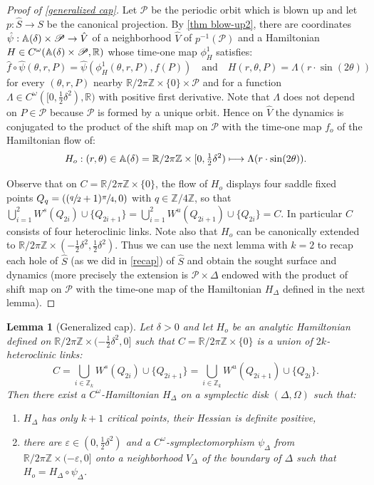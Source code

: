 \documentclass[JEP,XML,SOM,Unicode,NoFloatCountersInSection,Unicode,published]{cedram}
\newcommand\mto{\mathchoice{\longmapsto}{\mapsto}{\mapsto}{\mapsto}}
\let\epsilon\varepsilon
\newcommand \cP{{\mathscr P}}
\newcommand\A{\mathbb A}
\newcommand\R{\mathbb R}
\newcommand\Z{\mathbb Z}
\newcommand\qand{\quad \text{and}\quad}
\newtheorem{lemma}[proposition] {Lemma}
\theoremstyle{definition}
\begin{document}
\begin{proof}[Proof of \cref{generalized cap}]
Let $\cP$ be the periodic orbit which is blown up and let $p: \hat S\to S$ be the canonical projection. By \cref{thm blow-up2}, there are coordinates $\hat \psi: \A(\delta)\times\nobreak \cP \to \hat V$ of a neighborhood $\hat V$ of $p^{-1}(\cP)$ and a Hamiltonian $H\in C^\omega (\A(\delta)\times\nobreak \cP, \R)$ whose time-one map $\phi_H^1$ satisfies:
\[\hat f \circ \hat \psi (\theta, r,P) = \hat \psi(\phi_H^1(\theta,r,P), f(P)) \qand H (r,\theta,P)= \Lambda (r \cdot \sin(2\theta)) \]
for every $(\theta,r,P)$ nearby $\R/2\pi \Z\times \{0\}\times \cP$
and for a function $\Lambda\in C^\omega([0,\tfrac12 \delta^2),\R)$ with positive first derivative.
Note that $\Lambda$ does not depend on $P \in \cP$ because $\cP$ is formed by a unique orbit.
Hence on $\hat V$ the dynamics is conjugated to the product of the shift map on $\cP$ with the time-one map $f_o$ of the Hamiltonian flow of:
\[H_o: (r,\theta)\in \A(\delta)=\R/2\pi\Z\times [0,\tfrac12 \delta^2)\mto \Lambda (r \cdot \sin(2\theta)). \]

Observe that on $C= \R/2\pi\Z\times \{0\}$, the flow of $H_o$ displays four saddle fixed points $Q_q=((\sfrac q 2+1)\sfrac\pi4,0)$ with $q\in \Z/4\Z$, so that $ \bigcup_{i=1}^2 W^s(Q_{2i})\cup \{Q_{2i+1}\} =
\bigcup_{i=1}^2 W^u(Q_{2i+1})\cup \{Q_{2i}\}= C$.
In particular $C$ consists of four heteroclinic links. Note also that $H_o$ can be canonically extended to $\R/2\pi \Z\times (-\tfrac12 \delta^2,\tfrac12 \delta^2)$. Thus we can use the next lemma with $k=2$ to recap each hole of $\hat S$ (as we did in \cref{recap}) of $\hat S $ and obtain the sought surface and dynamics (more precisely the extension is $ \cP\times\Delta$ endowed with the product of shift map on $\cP$ with the time-one map of the Hamiltonian $H_\Delta$ defined in the next lemma). \end{proof}

\begin{lemma}[Generalized cap]\label{fonda3}\label{Generalized cap}
Let $\delta>0$ and let $H_o$ be an analytic Hamiltonian defined on $ \R/2\pi\Z\times (-\tfrac12 \delta^2,0]$ such that $C=\R/2\pi\Z\times \{0\} $ is a union of $2k$-heteroclinic links:
\[C= \bigcup_{i\in \Z_k} W^s(Q_{2i}) \cup \{Q_{2i+1}\}= \bigcup_{i\in \Z_k} W^u(Q_{2i+1}) \cup \{Q_{2i}\}.\]
Then there exist a $C^\omega$-Hamiltonian $H_\Delta$ on a symplectic disk $(\Delta,\Omega) $ such that:
\begin{enumerate}
\item $H_\Delta$ has only $k+1$ critical points, their Hessian is definite positive,
\item there are $\epsilon\in (0,\tfrac12 \delta^2)$ and a $C^\omega$-symplectomorphism $ \psi_\Delta$ from $ \R/2\pi\Z \times (-\epsilon,0]$ onto a neighborhood $V_\Delta$ of the boundary of $\Delta$
such that $H_o= H_\Delta\circ \psi_\Delta$.
\end{enumerate}
\end{lemma}
\end{document}
